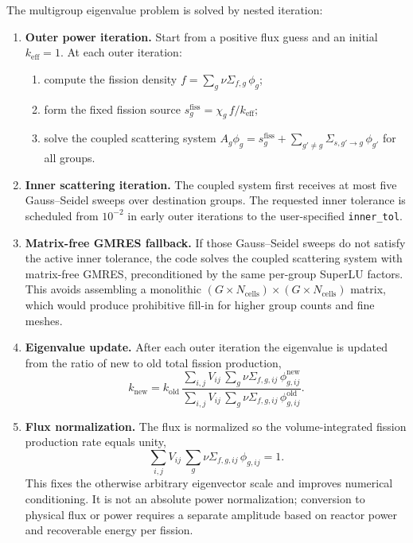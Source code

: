 \documentclass[11pt]{article}
\begin{document}
The multigroup eigenvalue problem is solved by nested iteration:

\begin{enumerate}
  \item \textbf{Outer power iteration.}  Start from a positive flux guess
        and an initial $k_{\mathrm{eff}} = 1$.  At each outer iteration:
        \begin{enumerate}
          \item compute the fission density $f = \sum_g \nu\Sigma_{f,g}\,\phi_g$;
          \item form the fixed fission source $s^{\mathrm{fiss}}_g
                = \chi_g\,f / k_{\mathrm{eff}}$;
          \item solve the coupled scattering system
                $A_g \phi_g = s^{\mathrm{fiss}}_g
                + \sum_{g'\neq g} \Sigma_{s,g'\to g}\,\phi_{g'}$
                for all groups.
        \end{enumerate}
  \item \textbf{Inner scattering iteration.}  The coupled system first receives
        at most five Gauss--Seidel sweeps over destination groups.  The
        requested inner tolerance is scheduled from $10^{-2}$ in early outer
        iterations to the user-specified \texttt{inner\_tol}.
  \item \textbf{Matrix-free GMRES fallback.}  If those Gauss--Seidel sweeps do
        not satisfy the active inner tolerance, the code solves the coupled
        scattering system with matrix-free GMRES, preconditioned by the same
        per-group SuperLU factors.  This avoids assembling a monolithic
        $(G \times N_{\mathrm{cells}}) \times (G \times N_{\mathrm{cells}})$
        matrix, which would produce prohibitive fill-in for higher group
        counts and fine meshes.
  \item \textbf{Eigenvalue update.}  After each outer iteration the eigenvalue
        is updated from the ratio of new to old total fission production,
        \[
        k_{\mathrm{new}}
        = k_{\mathrm{old}}\,
        \frac{\sum_{i,j} V_{ij}\,\sum_g \nu\Sigma_{f,g,ij}\,\phi_{g,ij}^{\mathrm{new}}}
             {\sum_{i,j} V_{ij}\,\sum_g \nu\Sigma_{f,g,ij}\,\phi_{g,ij}^{\mathrm{old}}} .
        \]
  \item \textbf{Flux normalization.}  The flux is normalized so the
        volume-integrated fission production rate equals unity,
        \[
        \sum_{i,j} V_{ij}\,\sum_g \nu\Sigma_{f,g,ij}\,\phi_{g,ij} = 1 .
        \]
        This fixes the otherwise arbitrary eigenvector scale and improves
        numerical conditioning.  It is not an absolute power normalization;
        conversion to physical flux or power requires a separate amplitude
        based on reactor power and recoverable energy per fission.
\end{enumerate}
\end{document}
